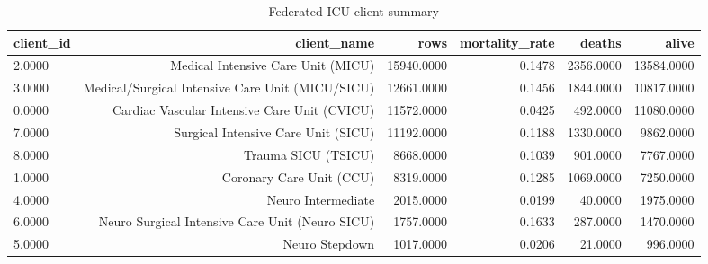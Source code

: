 \documentclass[11pt]{article}
\begin{document}
\begin{table}[H]
\centering
\caption{Federated ICU client summary}
\label{tab:clients}
\begin{tabular}{lrrrrr}
\toprule
client\_id & client\_name & rows & mortality\_rate & deaths & alive \\
\midrule
2.0000 & Medical Intensive Care Unit (MICU) & 15940.0000 & 0.1478 & 2356.0000 & 13584.0000 \\
3.0000 & Medical/Surgical Intensive Care Unit (MICU/SICU) & 12661.0000 & 0.1456 & 1844.0000 & 10817.0000 \\
0.0000 & Cardiac Vascular Intensive Care Unit (CVICU) & 11572.0000 & 0.0425 & 492.0000 & 11080.0000 \\
7.0000 & Surgical Intensive Care Unit (SICU) & 11192.0000 & 0.1188 & 1330.0000 & 9862.0000 \\
8.0000 & Trauma SICU (TSICU) & 8668.0000 & 0.1039 & 901.0000 & 7767.0000 \\
1.0000 & Coronary Care Unit (CCU) & 8319.0000 & 0.1285 & 1069.0000 & 7250.0000 \\
4.0000 & Neuro Intermediate & 2015.0000 & 0.0199 & 40.0000 & 1975.0000 \\
6.0000 & Neuro Surgical Intensive Care Unit (Neuro SICU) & 1757.0000 & 0.1633 & 287.0000 & 1470.0000 \\
5.0000 & Neuro Stepdown & 1017.0000 & 0.0206 & 21.0000 & 996.0000 \\
\bottomrule
\end{tabular}
\end{table}
\end{document}
